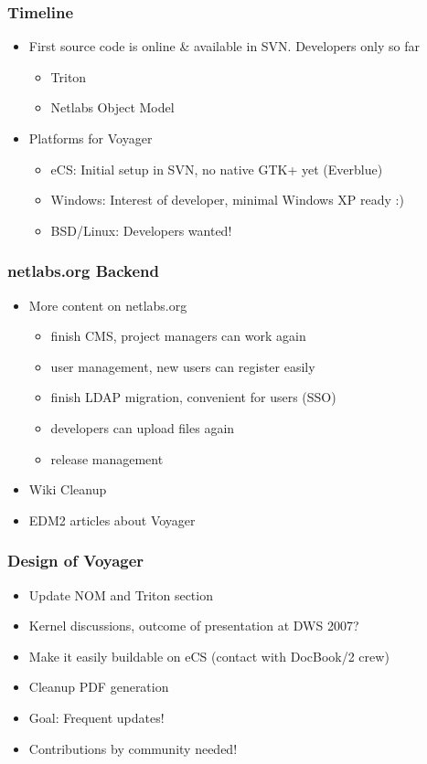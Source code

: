 \documentclass{beamer}
\begin{document}
\begin{frame}[allowframebreaks]
\frametitle{Timeline}
\begin{itemize}
  \item First source code is online \& available in SVN. Developers only so far
  \begin{itemize}
    \item Triton
    \item Netlabs Object Model
  \end{itemize}
  \item Platforms for Voyager
  \begin{itemize}
    \item eCS: Initial setup in SVN, no native GTK+ yet (Everblue)
  	\item Windows: Interest of developer, minimal Windows XP ready :)
  	\item BSD/Linux: Developers wanted!
  \end{itemize}
\end{itemize}
\end{frame}

\begin{frame}
\frametitle{netlabs.org Backend}
\begin{itemize}[<+->] 
  \item More content on netlabs.org
  \begin{itemize}[<+->]
    \item finish CMS, project managers can work again
    \item user management, new users can register easily
    \item finish LDAP migration, convenient for users (SSO)
    \item developers can upload files again
    \item release management
  \end{itemize}
  \item Wiki Cleanup
  \item EDM2 articles about Voyager
\end{itemize}
\end{frame}

\begin{frame}
\frametitle{Design of Voyager}
\begin{itemize}[<+->]
  \item Update NOM and Triton section
  \item Kernel discussions, outcome of presentation at DWS 2007?
  \item Make it easily buildable on eCS (contact with DocBook/2 crew)
  \item Cleanup PDF generation
  \item Goal: Frequent updates!
  \item Contributions by community needed!
\end{itemize}
\end{frame}
\end{document}
